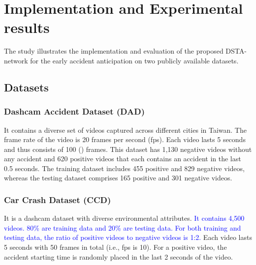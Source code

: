 \documentclass[journal]{IEEEtran}
\begin{document}
\section{Implementation and Experimental results}
The study illustrates the implementation and evaluation of the proposed DSTA-network for the early accident anticipation on two publicly available datasets. 

\subsection{Datasets}



\subsubsection{Dashcam Accident Dataset (DAD) \cite{chan2016anticipating}} It contains a diverse set of videos captured across different cities in Taiwan. The frame rate of the video is 20 frames per second (fps). Each video lasts 5 seconds and thus consists of 100 () frames. This dataset has 1,130 negative videos without any accident and 620 positive videos that each contains an accident in the last 0.5 seconds. The training dataset includes 455 positive and 829 negative videos, whereas the testing dataset comprises 165 positive and 301 negative videos. 

\subsubsection{Car Crash Dataset (CCD) \cite{bao2020uncertainty}}
It is a dashcam dataset with diverse environmental attributes. \textcolor{blue}{It contains 4,500 videos. 80\% are training data and 20\% are testing data. For both training and testing data, the ratio of positive videos to negative videos is 1:2.} Each video lasts 5 seconds with 50 frames in total (i.e., fps is 10). For a positive video, the accident starting time is randomly placed in the last 2 seconds of the video.
\end{document}
